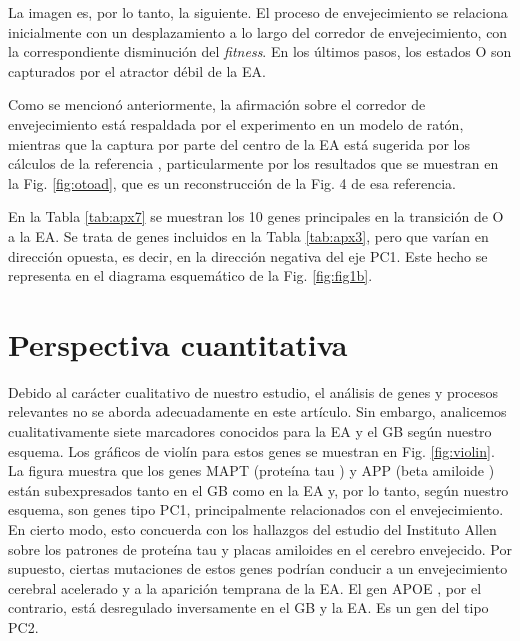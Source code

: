 La imagen es, por lo tanto, la siguiente. El proceso de envejecimiento se relaciona inicialmente con un desplazamiento a lo largo del corredor de envejecimiento, con la correspondiente disminución del \textit{fitness}. En los últimos pasos, los estados O son capturados por el atractor débil de la EA.

Como se mencionó anteriormente, la afirmación sobre el corredor de envejecimiento está respaldada por el experimento en un modelo de ratón, mientras que la captura por parte del centro de la EA está sugerida por los cálculos de la referencia \cite{Gonzalez_2021}, particularmente por los resultados que se muestran en la Fig. \ref{fig:otoad}, que es un reconstrucción de la Fig. 4 de esa referencia.

En la Tabla \ref{tab:apx7} se muestran los 10 genes principales en la transición de O a la EA. Se trata de genes incluidos en la Tabla \ref{tab:apx3}, pero que varían en dirección opuesta, es decir, en la dirección negativa del eje PC1. Este hecho se representa en el diagrama esquemático de la Fig. \ref{fig:fig1b}.


\section{Perspectiva cuantitativa}

Debido al carácter cualitativo de nuestro estudio, el análisis de genes y procesos relevantes no se aborda adecuadamente en este artículo. Sin embargo, analicemos cualitativamente siete marcadores conocidos para la EA y el GB según nuestro esquema. Los gráficos de violín para estos genes se muestran en Fig. \ref{fig:violin}. La figura muestra que los genes MAPT (proteína tau \cite{Strang_2019}) y APP (beta amiloide \cite{TCW_2016}) están subexpresados tanto en el GB como en la EA y, por lo tanto, según nuestro esquema, son genes tipo PC1, principalmente relacionados con el envejecimiento. En cierto modo, esto concuerda con los hallazgos del estudio del Instituto Allen sobre los patrones de proteína tau y placas amiloides en el cerebro envejecido. Por supuesto, ciertas mutaciones de estos genes podrían conducir a un envejecimiento cerebral acelerado y a la aparición temprana de la EA. El gen APOE \cite{Raulin_2022}, por el contrario, está desregulado inversamente en el GB y la EA. Es un gen del tipo PC2.

